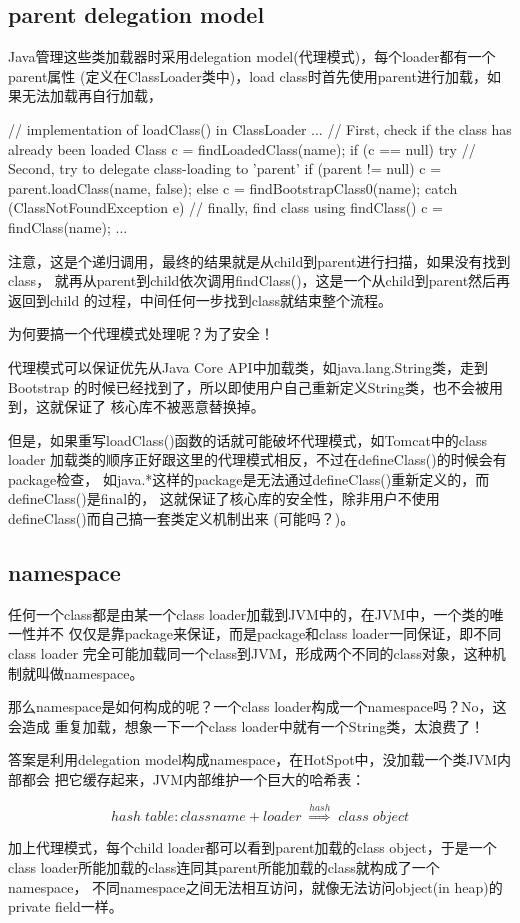 \subsection[parent delegation model]{parent delegation model}
\label{sec:delegationmodel}
Java管理这些类加载器时采用delegation model(代理模式)，每个loader都有一个parent属性
(定义在ClassLoader类中)，load class时首先使用parent进行加载，如果无法加载再自行加载，

\begin{javacode}
// implementation of loadClass() in ClassLoader
...
// First, check if the class has already been loaded
Class c = findLoadedClass(name);
if (c == null) {
  try {
    // Second, try to delegate class-loading to 'parent'
    if (parent != null) {
      c = parent.loadClass(name, false);
    } else {
      c = findBootstrapClass0(name);
    }
  } catch (ClassNotFoundException e) {
    // finally, find class using findClass()
    c = findClass(name);
  }
}
...
\end{javacode}

注意，这是个递归调用，最终的结果就是从child到parent进行扫描，如果没有找到class，
就再从parent到child依次调用findClass()，这是一个从child到parent然后再返回到child
的过程，中间任何一步找到class就结束整个流程。

为何要搞一个代理模式处理呢？为了安全！

代理模式可以保证优先从Java Core API中加载类，如java.lang.String类，走到Bootstrap
的时候已经找到了，所以即使用户自己重新定义String类，也不会被用到，这就保证了
核心库不被恶意替换掉。

但是，如果重写loadClass()函数的话就可能破坏代理模式，如Tomcat中的class loader
加载类的顺序正好跟这里的代理模式相反，不过在defineClass()的时候会有package检查，
如java.*这样的package是无法通过defineClass()重新定义的，而defineClass()是final的，
这就保证了核心库的安全性，除非用户不使用defineClass()而自己搞一套类定义机制出来
(可能吗？)。

\subsection[namespace]{namespace}
任何一个class都是由某一个class loader加载到JVM中的，在JVM中，一个类的唯一性并不
仅仅是靠package来保证，而是package和class loader一同保证，即不同class loader
完全可能加载同一个class到JVM，形成两个不同的class对象，这种机制就叫做namespace。

那么namespace是如何构成的呢？一个class loader构成一个namespace吗？No，这会造成
重复加载，想象一下一个class loader中就有一个String类，太浪费了！

答案是利用delegation model构成namespace，在HotSpot中，没加载一个类JVM内部都会
把它缓存起来，JVM内部维护一个巨大的哈希表：

$$hash\;table: classname+loader\;\overset{hash}\Longrightarrow\;class\;object$$

加上代理模式，每个child loader都可以看到parent加载的class object，于是一个
class loader所能加载的class连同其parent所能加载的class就构成了一个namespace，
不同namespace之间无法相互访问，就像无法访问object(in heap)的private field一样。

